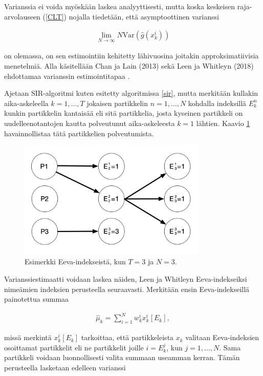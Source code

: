 \documentclass[
  12pt,
  a4paper, twoside]{book}
\begin{document}
Varianssia ei voida myöskään laskea analyyttisesti, mutta koska keskeisen raja-arvolauseen (\ref{CLT}) nojalla tiedetään, että asymptoottinen varianssi

\begin{align}\label{asymptoottinen-varianssi}
\lim_{N\to \infty} N \text {Var}(\hat{g}(x_k^i))
\end{align}

\noindent on olemassa, on sen estimointiin kehitetty lähivuosina joitakin approksimatiivisia menetelmiä. Alla käsitellään Chan ja Lain (2013) \citep{Chan-2013} sekä Leen ja Whitleyn (2018) ehdottamaa varianssin estimointitapaa \citep{Lee-2018}.

Ajetaan SIR-algoritmi kuten esitetty algoritmissa \ref{sir}, mutta merkitään kullakin aika-askeleella \(k=1,\ldots,T\) jokaisen partikkelin \(n=1,\ldots,N\) kohdalla indeksillä \(E_k^n\) kunkin partikkelin kantaisää eli sitä partikkelia, josta kyseinen partikkeli on uudelleenotantojen kautta polveutunut aika-askeleesta \(k=1\) lähtien. Kaavio \ref{fig:eeva-indeksit} havainnollistaa tätä partikkelien polveutumista.

\begin{figure}[H]
\centering
\includegraphics[width=9cm]{eevaindeksit}
\caption{Esimerkki Eeva-indekseistä, kun $T=3$ ja $N=3$.}
\label{fig:eeva-indeksit}
\end{figure}

Varianssiestimaatti voidaan laskea näiden, Leen ja Whitleyn Eeva-indekseiksi nimeämien indeksien perusteella seuraavasti. Merkitään ensin Eeva-indekseillä painotettua summaa

\begin{align}\label{CLE-sum}
\hat{\mu}_k=\sum_{i=1}^N w_k^i x_k^i[E_k]
,\end{align}

\noindent missä merkintä \(x_k^i[E_k]\) tarkoittaa, että partikkeleista \(x_k\) valitaan Eeva-indeksien osoittamat partikkelit eli ne partikkelit joille \(i=E_k^j\), kun \(j=1,\ldots,N\). Sama partikkeli voidaan luonnollisesti valita summaan useamman kerran. Tämän perusteella lasketaan edelleen varianssi
\end{document}
